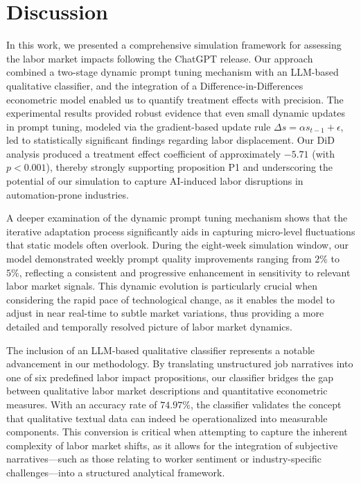 \documentclass{article}
\begin{document}
\section{Discussion}
In this work, we presented a comprehensive simulation framework for assessing the labor market impacts following the ChatGPT release. Our approach combined a two-stage dynamic prompt tuning mechanism with an LLM-based qualitative classifier, and the integration of a Difference-in-Differences econometric model enabled us to quantify treatment effects with precision. The experimental results provided robust evidence that even small dynamic updates in prompt tuning, modeled via the gradient-based update rule \( \Delta s = \alpha s_{t-1} + \epsilon \), led to statistically significant findings regarding labor displacement. Our DiD analysis produced a treatment effect coefficient of approximately \(-5.71\) (with \(p < 0.001\)), thereby strongly supporting proposition P1 and underscoring the potential of our simulation to capture AI-induced labor disruptions in automation-prone industries.

A deeper examination of the dynamic prompt tuning mechanism shows that the iterative adaptation process significantly aids in capturing micro-level fluctuations that static models often overlook. During the eight-week simulation window, our model demonstrated weekly prompt quality improvements ranging from \(2\%\) to \(5\%\), reflecting a consistent and progressive enhancement in sensitivity to relevant labor market signals. This dynamic evolution is particularly crucial when considering the rapid pace of technological change, as it enables the model to adjust in near real-time to subtle market variations, thus providing a more detailed and temporally resolved picture of labor market dynamics.

The inclusion of an LLM-based qualitative classifier represents a notable advancement in our methodology. By translating unstructured job narratives into one of six predefined labor impact propositions, our classifier bridges the gap between qualitative labor market descriptions and quantitative econometric measures. With an accuracy rate of \(74.97\%\), the classifier validates the concept that qualitative textual data can indeed be operationalized into measurable components. This conversion is critical when attempting to capture the inherent complexity of labor market shifts, as it allows for the integration of subjective narratives—such as those relating to worker sentiment or industry-specific challenges—into a structured analytical framework.
\end{document}
